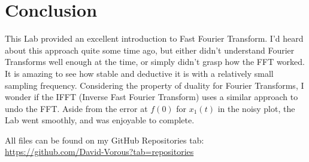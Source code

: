 \documentclass[12pt]{report}
\begin{document}
\section{Conclusion}
This Lab provided an excellent introduction to Fast Fourier Transform. I'd heard about this approach quite some time ago, but either didn't understand Fourier Transforms well enough at the time, or simply didn't grasp how the FFT worked. It is amazing to see how stable and deductive it is with a relatively small sampling frequency. Considering the property of duality for Fourier Transforms, I wonder if the IFFT (Inverse Fast Fourier Transform) uses a similar approach to undo the FFT. Aside from the error at $f(0)$ for $x_1 (t)$ in the noisy plot, the Lab went smoothly, and was enjoyable to complete.

All files can be found on my GitHub Repositories tab:\\
\url{https://github.com/David-Vorous?tab=repositories}
\end{document}
